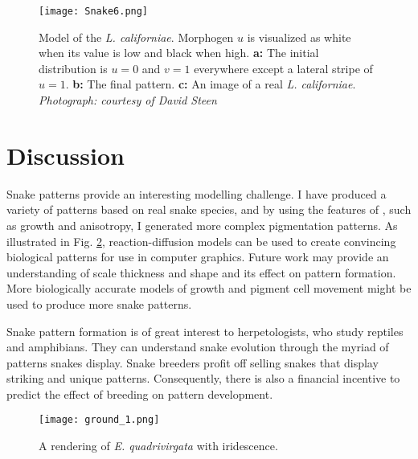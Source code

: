 \begin{figure}[ht]
	\centering
	\texttt{[image: Snake6.png]}
	\caption{Model of the \textit{L. californiae}. Morphogen $u$ is visualized as white when its value is low and black when high. \textbf{a:} The initial distribution is $u=0$ and $v=1$ everywhere except a lateral stripe  of $u=1$. \textbf{b:} The final pattern. \textbf{c:} An image of a real \textit{L. californiae}. \textit{Photograph: courtesy of David Steen}}
	\label{fig:Snake6}
\end{figure}

\newpage

\section{Discussion}
Snake patterns provide an interesting modelling challenge. I have produced a variety of patterns based on real snake species, and by using the features of \ProgramName{}, such as growth and anisotropy, I generated more complex pigmentation patterns. As illustrated in Fig. \ref{fig:SnakeRendering}, reaction-diffusion models can be used to create convincing biological patterns for use in computer graphics. Future work may provide an understanding of scale thickness and shape and its effect on pattern formation. More biologically accurate models of growth and pigment cell movement might be used to produce more snake patterns.

Snake pattern formation is of great interest to herpetologists, who study reptiles and amphibians. They can understand snake evolution through the myriad of patterns snakes display. Snake breeders profit off selling snakes that display striking and unique patterns. Consequently, there is also a financial incentive to predict the effect of breeding on pattern development. 

\begin{figure}[ht]
	\centering
	\texttt{[image: ground\_1.png]}
	\caption{A rendering of \textit{E. quadrivirgata} with iridescence.}
	\label{fig:SnakeRendering}
\end{figure}

